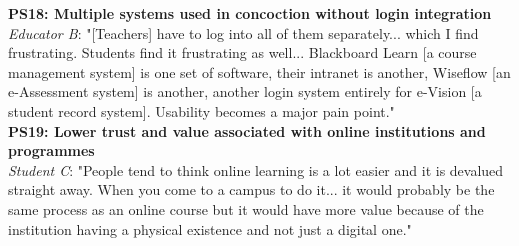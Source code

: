 \textbf{PS18: Multiple systems used in concoction without login integration}\\
\textit{Educator B}: "[Teachers] have to log into all of them separately... which I find frustrating. 
Students find it frustrating as well... Blackboard Learn [a course management system] is one set of 
software, their intranet is another, Wiseflow [an e-Assessment system] is another, another login system 
entirely for e-Vision [a student record system]. Usability becomes a major pain point."
\vspace{0.25cm}\\
\textbf{PS19: Lower trust and value associated with online institutions and programmes}\\
\textit{Student C}: "People tend to think online learning is a lot easier and it is devalued straight away. 
When you come to a campus to do it... it would probably be the same process as an online course but 
it would have more value because of the institution having a physical existence and not just a digital one."

